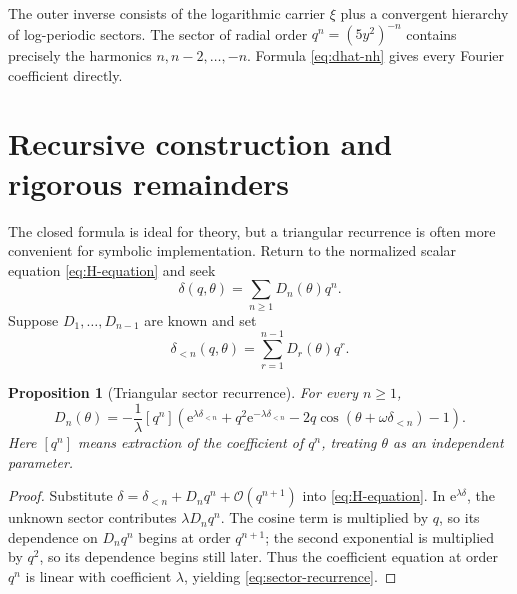 \documentclass[11pt,oneside]{article}
\numberwithin{equation}{section}
\theoremstyle{plain}
\newtheorem{proposition}[theorem]{Proposition}
\theoremstyle{definition}
\theoremstyle{remark}
\newcommand{\e}{\mathrm e}
\newcommand{\Ord}{\mathcal O}
\begin{document}
\begin{summarybox}
The outer inverse consists of the logarithmic carrier \(\xi\) plus a
convergent hierarchy of log-periodic sectors.  The sector of radial order
\(q^n=(5y^2)^{-n}\) contains precisely the harmonics
\(n,n-2,\ldots,-n\).  Formula \cref{eq:dhat-nh} gives every Fourier
coefficient directly.
\end{summarybox}
\section{Recursive construction and rigorous remainders}\label{sec:recurrence}

The closed formula is ideal for theory, but a triangular recurrence is often
more convenient for symbolic implementation.  Return to the normalized
scalar equation \cref{eq:H-equation} and seek
\begin{equation}\label{eq:delta-series-D}
 \delta(q,\theta)=\sum_{n\ge1}D_n(\theta)q^n.
\end{equation}
Suppose \(D_1,\ldots,D_{n-1}\) are known and set
\begin{equation}\label{eq:delta-less-n}
 \delta_{<n}(q,\theta)=\sum_{r=1}^{n-1}D_r(\theta)q^r.
\end{equation}

\begin{proposition}[Triangular sector recurrence]\label{prop:sector-recurrence}
For every \(n\ge1\),
\begin{equation}\label{eq:sector-recurrence}
 \boxed{
 D_n(\theta)=-\frac1\lambda[q^n]\left(
 \e^{\lambda\delta_{<n}}
 +q^2\e^{-\lambda\delta_{<n}}
 -2q\cos(\theta+\omega\delta_{<n})-1
 \right).
 }
\end{equation}
Here \([q^n]\) means extraction of the coefficient of \(q^n\), treating
\(\theta\) as an independent parameter.
\end{proposition}

\begin{proof}
Substitute
\(
 \delta=\delta_{<n}+D_nq^n+\Ord(q^{n+1})
\)
into \cref{eq:H-equation}.  In \(\e^{\lambda\delta}\), the unknown sector
contributes \(\lambda D_nq^n\).  The cosine term is multiplied by \(q\), so
its dependence on \(D_nq^n\) begins at order \(q^{n+1}\); the second
exponential is multiplied by \(q^2\), so its dependence begins still later.
Thus the coefficient equation at order \(q^n\) is linear with coefficient
\(\lambda\), yielding \cref{eq:sector-recurrence}.
\end{proof}
\end{document}
